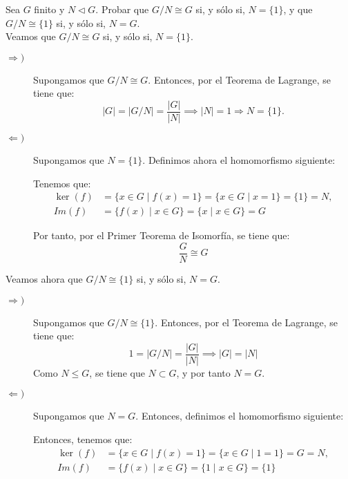 \begin{ejercicio}\label{ej:9_relacion4}
    Sea $G$ finito y $N\lhd G$. Probar que $G/N\cong G$ si, y sólo si, $N=\{1\}$, y que $G/N\cong \{1\}$ si, y sólo si, $N=G$.\\

    Veamos que $G/N\cong G$ si, y sólo si, $N=\{1\}$.
    \begin{description}
        \item[$\Longrightarrow)$] Supongamos que $G/N\cong G$. Entonces, por el Teorema de Lagrange, se tiene que:
        \begin{equation*}
            |G| = |G/N| = \dfrac{|G|}{|N|} \implies |N|=1\Longrightarrow N=\{1\}.
        \end{equation*}

        \item[$\Longleftarrow)$] Supongamos que $N=\{1\}$. Definimos ahora el homomorfismo siguiente:

        Tenemos que:
        \begin{align*}
            \ker(f) &= \{x\in G\mid f(x)=1\} = \{x\in G\mid x=1\} = \{1\} = N,\\
            Im(f) &= \{f(x)\mid x\in G\} = \{x\mid x\in G\} = G
        \end{align*}

        Por tanto, por el Primer Teorema de Isomorfía, se tiene que:
        \begin{equation*}
            \dfrac{G}{N}\cong G
        \end{equation*}
    \end{description}

    Veamos ahora que $G/N\cong \{1\}$ si, y sólo si, $N=G$.
    \begin{description}
        \item[$\Longrightarrow)$] Supongamos que $G/N\cong \{1\}$. Entonces, por el Teorema de Lagrange, se tiene que:
        \begin{equation*}
            1 = |G/N| = \dfrac{|G|}{|N|} \implies |G|=|N|
        \end{equation*}
        Como $N\leq G$, se tiene que $N\subset G$, y por tanto $N=G$.

        \item[$\Longleftarrow)$] Supongamos que $N=G$. Entonces, definimos el homomorfismo siguiente:

        Entonces, tenemos que:
        \begin{align*}
            \ker(f) &= \{x\in G\mid f(x)=1\} = \{x\in G\mid 1=1\} = G = N,\\
            Im(f) &= \{f(x)\mid x\in G\} = \{1\mid x\in G\} = \{1\}
        \end{align*}


\end{description}
\end{ejercicio}
